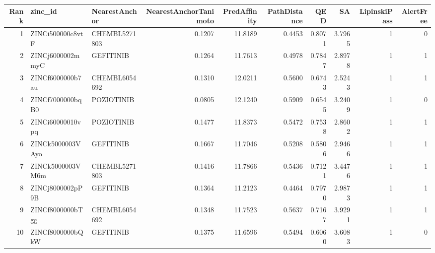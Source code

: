\begin{tabular}{rllrrrrrrr}
\toprule
Rank & zinc\_id & NearestAnchor & NearestAnchorTanimoto & PredAffinity & PathDistance & QED & SA & LipinskiPass & AlertFree \\
\midrule
1 & ZINCi500000c8vtF & CHEMBL5271803 & 0.1207 & 11.8189 & 0.4453 & 0.8071 & 3.7965 & 1 & 0 \\
2 & ZINCj6000002mmyC & GEFITINIB & 0.1264 & 11.7613 & 0.4978 & 0.7847 & 2.8978 & 1 & 1 \\
3 & ZINCf6000000b7au & CHEMBL6054692 & 0.1310 & 12.0211 & 0.5600 & 0.6743 & 2.5243 & 1 & 1 \\
4 & ZINCf7000000bqB0 & POZIOTINIB & 0.0805 & 12.1240 & 0.5909 & 0.6545 & 3.2409 & 1 & 0 \\
5 & ZINCi60000010vpq & POZIOTINIB & 0.1477 & 11.8373 & 0.5472 & 0.7538 & 2.8602 & 1 & 1 \\
6 & ZINCk5000003VAyo & GEFITINIB & 0.1667 & 11.7046 & 0.5208 & 0.5806 & 2.9466 & 1 & 1 \\
7 & ZINCk5000003VM6m & CHEMBL5271803 & 0.1416 & 11.7866 & 0.5436 & 0.7121 & 3.4476 & 1 & 1 \\
8 & ZINCj8000002pP9B & GEFITINIB & 0.1364 & 11.2123 & 0.4464 & 0.7970 & 2.9873 & 1 & 1 \\
9 & ZINCf8000000bTgg & CHEMBL6054692 & 0.1348 & 11.7523 & 0.5637 & 0.7167 & 3.9291 & 1 & 1 \\
10 & ZINCf8000000bQkW & GEFITINIB & 0.1375 & 11.6596 & 0.5494 & 0.6060 & 3.6083 & 1 & 0 \\
\bottomrule
\end{tabular}
